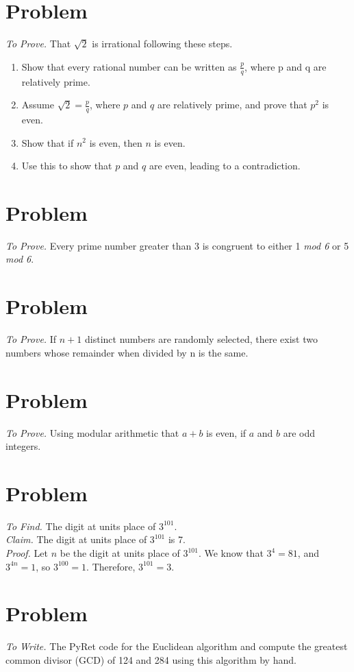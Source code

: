 \documentclass[11pt]{article}
\begin{document}
\section{Problem} \emph{To Prove. } That $\sqrt{2}$ is irrational following these steps.
\begin{enumerate}
	\item Show that every rational number can be written as $\frac{p}{q}$, where p and q are relatively prime.
	\item Assume $\sqrt{2} = \frac{p}{q}$, where $p$ and $q$ are relatively prime, and prove that $p^2$ is even.
	\item Show that if $n^2$ is even, then $n$ is even.
	\item Use this to show that $p$ and $q$ are even, leading to a contradiction.
\end{enumerate}





\section{Problem} \emph{To Prove. } Every prime number greater than 3 is congruent to either 1 \emph{mod 6} or 5 \emph{mod 6}. \medskip \\


\section{Problem} \emph{To Prove. } If $n + 1$ distinct numbers are randomly selected, there exist two numbers whose remainder when divided by n is the same. \medskip \\


\section{Problem} \emph{To Prove. } Using modular arithmetic that $a + b$ is even, if $a$ and $b$ are odd integers. \medskip \\




\section{Problem}
\emph{To Find. } The digit at units place of $3^{101}$. \medskip \\
\emph{Claim. } The digit at units place of $3^{101}$ is 7. \medskip \\
\emph{Proof. } Let $n$ be the digit at units place of $3^{101}$. We know that $3^4 = 81$, and $3^{4n} = 1$, so $3^{100} = 1$. Therefore, $3^{101} = 3$. \medskip \\





\section{Problem}
\emph{To Write. } The PyRet code for the Euclidean algorithm and compute the greatest common divisor (GCD) of 124 and 284 using this algorithm by hand.
\end{document}
